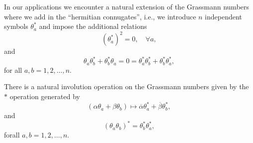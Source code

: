 \documentclass[prl,twocolumn,lengthcheck,superscriptaddress]{revtex4-1}
\theoremstyle{definition}
\theoremstyle{remark}
\begin{document}
In our applications we encounter a natural extension of the Grassmann numbers where we add in the ``hermitian connugates'', i.e., we introduce $n$ independent symbols $\theta_a^*$ and impose the additional relations
\begin{equation}
	(\theta_a^*)^2 = 0, \quad \forall a,
\end{equation}
and
\begin{equation}
	\theta_a\theta_b^* + \theta_b^* \theta_a = 0 = \theta_a^*\theta_b^* + \theta_b^* \theta_a^*,
\end{equation}
for all $a,b = 1,2, \ldots, n$.

There is a natural involution operation on the Grassmann numbers given by the $*$ operation generated by
\begin{equation}
	(\alpha\theta_a + \beta\theta_b) \mapsto \overline{\alpha}\theta_a^* + \overline{\beta}\theta_b^*,
\end{equation}
and 
\begin{equation}
	(\theta_a\theta_b)^* = \theta_b^*\theta_a^*,
\end{equation}
forall $a,b = 1, 2, \ldots, n$.
\end{document}
